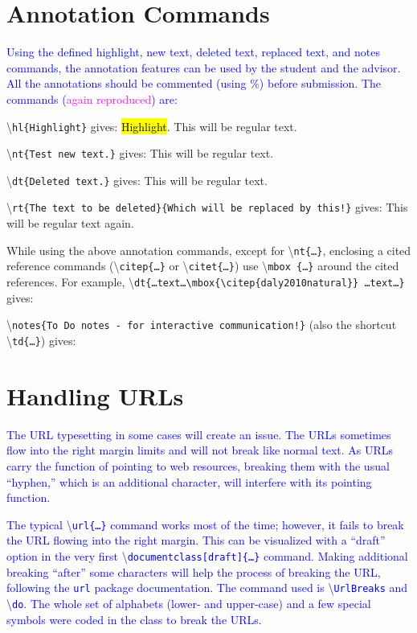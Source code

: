 \documentclass[phd,showgrids]{ndsu-thesis-2022}
\newcommand\italk[1]{\textcolor{blue}{#1}}  %
\newcommand\cmd[1]{\textbackslash\texttt{#1}}  %
\begin{document}
\section{Annotation Commands}
\italk{Using the defined highlight, new text, deleted text, replaced text, and notes commands, the annotation features can be used by the student and the advisor. All the annotations should be commented (using \%) before submission. The commands (\textcolor{magenta}{again reproduced}) are:} 

\textbackslash\texttt{hl\{Highlight\}} gives: \hl{Highlight}. This will be regular text. 

\textbackslash\texttt{nt\{Test new text.\}} gives:  This will be regular text. 

\textbackslash\texttt{dt\{Deleted text.\}} gives:  This will be regular text. 

\textbackslash\texttt{rt\{The text to be deleted\}\{Which will be replaced by this!\}} gives:  This will be regular text again. 

\vspace{1.5ex}
While using the above annotation commands, except for \cmd{nt\{\ldots\}}, enclosing a cited reference commands (\cmd{citep\{\ldots\}} or \cmd{citet\{\ldots\}}) use \cmd{mbox
\{\ldots\}} around the cited references. For example, \cmd{dt\{\ldots text\ldots \cmd{mbox\{\cmd{citep\{daly2010natural\}}\}} \ldots text\ldots\}} 
gives:  

\vspace{1.5ex}
\textbackslash\texttt{notes\{To Do notes - for interactive communication!\}} (also the shortcut \cmd{td\{\ldots\}}) gives:  

\section{Handling URLs}
\italk{The URL typesetting in some cases will create an issue. The URLs sometimes flow into the right margin limits and will not break like normal text. As URLs carry the function of pointing to web resources, breaking them with the usual ``hyphen,'' which is an additional character, will interfere with its pointing function.} 

\italk{The typical \cmd{url\{\ldots\}} command works most of the time; however, it fails to break the URL flowing into the right margin. This can be visualized with a ``draft'' option in the very first \cmd{documentclass[draft]\{\ldots\}} command. Making additional breaking ``after'' some characters will help the process of breaking the URL, following the \texttt{url} package documentation. The command used is \cmd{UrlBreaks} and \cmd{do}. The whole set of alphabets (lower- and upper-case) and a few special symbols were coded in the class to break the URLs.}
\end{document}
